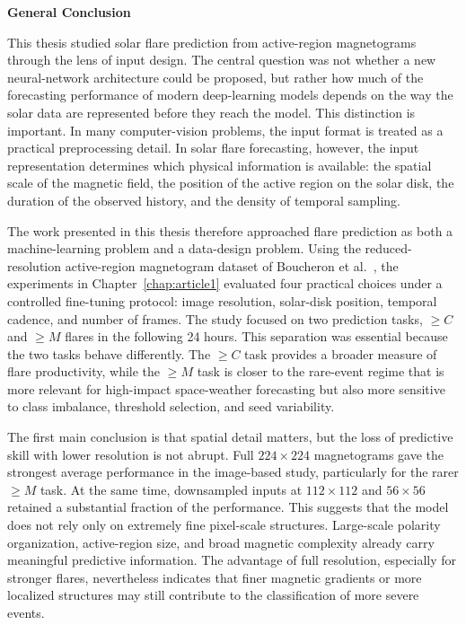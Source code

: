 \anglais

\cleardoublepage
{}
{}
\label{chap:general_conclusion}

{\LARGE\bfseries General Conclusion\par}
\vspace{2\baselineskip}


This thesis studied solar flare prediction from active-region magnetograms through the lens of input design. The central question was not whether a new neural-network architecture could be proposed, but rather how much of the forecasting performance of modern deep-learning models depends on the way the solar data are represented before they reach the model. This distinction is important. In many computer-vision problems, the input format is treated as a practical preprocessing detail. In solar flare forecasting, however, the input representation determines which physical information is available: the spatial scale of the magnetic field, the position of the active region on the solar disk, the duration of the observed history, and the density of temporal sampling.

The work presented in this thesis therefore approached flare prediction as both a machine-learning problem and a data-design problem. Using the reduced-resolution active-region magnetogram dataset of Boucheron et al.~\cite{ref_boucheron}, the experiments in Chapter~\ref{chap:article1} evaluated four practical choices under a controlled fine-tuning protocol: image resolution, solar-disk position, temporal cadence, and number of frames. The study focused on two prediction tasks, $\geq C$ and $\geq M$ flares in the following 24 hours. This separation was essential because the two tasks behave differently. The $\geq C$ task provides a broader measure of flare productivity, while the $\geq M$ task is closer to the rare-event regime that is more relevant for high-impact space-weather forecasting but also more sensitive to class imbalance, threshold selection, and seed variability.

The first main conclusion is that spatial detail matters, but the loss of predictive skill with lower resolution is not abrupt. Full $224\times224$ magnetograms gave the strongest average performance in the image-based study, particularly for the rarer $\geq M$ task. At the same time, downsampled inputs at $112\times112$ and $56\times56$ retained a substantial fraction of the performance. This suggests that the model does not rely only on extremely fine pixel-scale structures. Large-scale polarity organization, active-region size, and broad magnetic complexity already carry meaningful predictive information. The advantage of full resolution, especially for stronger flares, nevertheless indicates that finer magnetic gradients or more localized structures may still contribute to the classification of more severe events.

